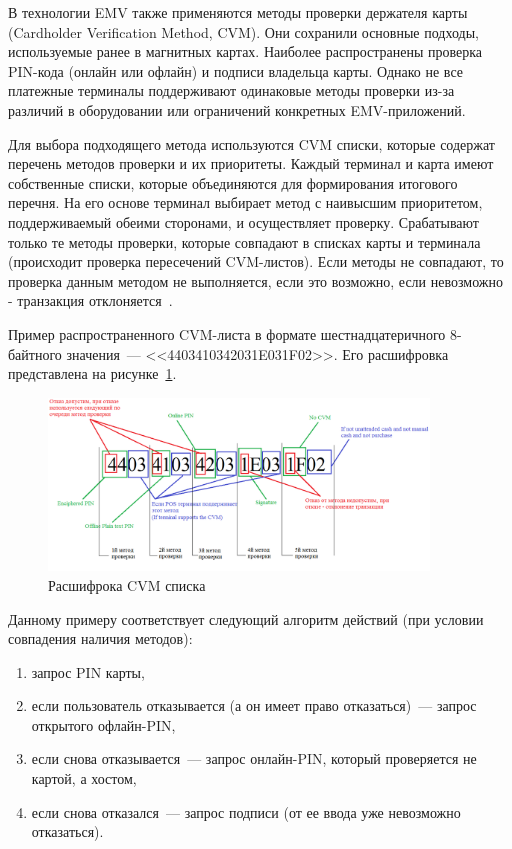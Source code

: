 В технологии EMV также применяются методы проверки держателя карты (Cardholder Verification Method, CVM).
Они сохранили основные подходы, используемые ранее в магнитных картах.
Наиболее распространены проверка PIN-кода (онлайн или офлайн) и подписи владельца карты.
Однако не все платежные терминалы поддерживают одинаковые методы проверки из-за различий в оборудовании или ограничений конкретных EMV-приложений.

Для выбора подходящего метода используются CVM списки, которые содержат перечень методов проверки и их приоритеты.
Каждый терминал и карта имеют собственные списки, которые объединяются для формирования итогового перечня.
На его основе терминал выбирает метод с наивысшим приоритетом, поддерживаемый обеими сторонами, и осуществляет проверку.
Срабатывают только те методы проверки, которые совпадают в списках карты и терминала (происходит проверка пересечений CVM-листов).
Если методы не совпадают, то проверка данным методом не выполняется, если это возможно, если невозможно - транзакция отклоняется~\cite{emv_card_mechanism, emv_book_3}.

Пример распространенного CVM-листа в формате шестнадцатеричного 8-байтного значения~--- <<4403410342031E031F02>>.
Его расшифровка представлена на рисунке~\ref{fig:cvm_check}.

\begin{figure}[H]
    \centering
    \includegraphics[width=0.9\textwidth]{images/research/cvm_check}
    \caption{\centering Расшифрока CVM списка}
    \label{fig:cvm_check}
\end{figure}

Данному примеру соответствует следующий алгоритм действий (при условии совпадения наличия методов):

\begin{enumerate}
    \item запрос PIN карты,
    \item если пользователь отказывается (а он имеет право отказаться)~--- запрос открытого офлайн-PIN,
    \item если снова отказывается~--- запрос онлайн-PIN, который проверяется не картой, а хостом,
    \item если снова отказался~--- запрос подписи (от ее ввода уже невозможно отказаться).
\end{enumerate}

